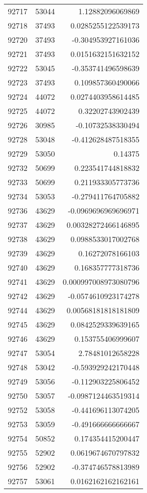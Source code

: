 \begin{tabular}{r | r | r}
92717 & 53044 & 1.12882096069869 \\
92718 & 37493 & 0.0285255122539173 \\
92720 & 37493 & -0.304953927161036 \\
92721 & 37493 & 0.0151632151632152 \\
92722 & 53045 & -0.353741496598639 \\
92723 & 37493 & 0.109857360490066 \\
92724 & 44072 & 0.0274403958614485 \\
92725 & 44072 & 0.32202743902439 \\
92726 & 30985 & -0.10732538330494 \\
92728 & 53048 & -0.412628487518355 \\
92729 & 53050 & 0.14375 \\
92732 & 50699 & 0.223541744818832 \\
92733 & 50699 & 0.211933305773736 \\
92734 & 53053 & -0.279411764705882 \\
92736 & 43629 & -0.0969696969696971 \\
92737 & 43629 & 0.00328272466146895 \\
92738 & 43629 & 0.0988533017002768 \\
92739 & 43629 & 0.16272078166103 \\
92740 & 43629 & 0.168357777318736 \\
92741 & 43629 & 0.000997008973080796 \\
92742 & 43629 & -0.0574610923174278 \\
92744 & 43629 & 0.00568181818181809 \\
92745 & 43629 & 0.0842529339639165 \\
92746 & 43629 & 0.153755406999607 \\
92747 & 53054 & 2.78481012658228 \\
92748 & 53042 & -0.593929242170448 \\
92749 & 53056 & -0.112903225806452 \\
92750 & 53057 & -0.0987124463519314 \\
92752 & 53058 & -0.441696113074205 \\
92753 & 53059 & -0.491666666666667 \\
92754 & 50852 & 0.174354415200447 \\
92755 & 52902 & 0.0619674670797832 \\
92756 & 52902 & -0.374746578813989 \\
92757 & 53061 & 0.0162162162162161 \\

\end{tabular}
